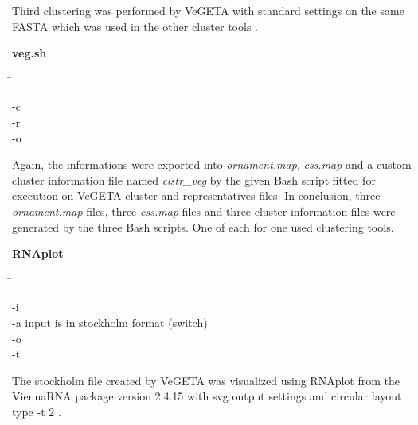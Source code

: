     Third clustering was performed by VeGETA with standard settings on the same FASTA which was used in the other cluster tools \autocite{vegeta}.
    
    \begin{leftbar}
        \textbf{veg.sh}
        \begin{nstabbing}
            \qquad \= \kill
        
            -c \\
        
            -r \\
            
            -o 
        \end{nstabbing}
    \end{leftbar}

    Again, the informations were exported into \textit{ornament.map}, \textit{css.map} and a custom cluster information file named \textit{clstr\_veg} by the given Bash script fitted for execution on VeGETA cluster and representatives files. In conclusion, three \textit{ornament.map} files, three \textit{css.map} files and three cluster information files were generated by the three Bash scripts. One of each for one used clustering tools.

    \begin{leftbar}
        \textbf{RNAplot}
        \begin{nstabbing}
            \qquad \= \kill
            
            -i \\
            
            -a \> input is in stockholm format (switch)\\
            
            -o \\
            
            -t 
        \end{nstabbing}
    \end{leftbar}
    
    The stockholm file created by VeGETA was visualized using RNAplot from the ViennaRNA package version 2.4.15 with svg output settings and circular layout type \colorbox{backcolour}{-t 2} \autocite{Vienna}. 

